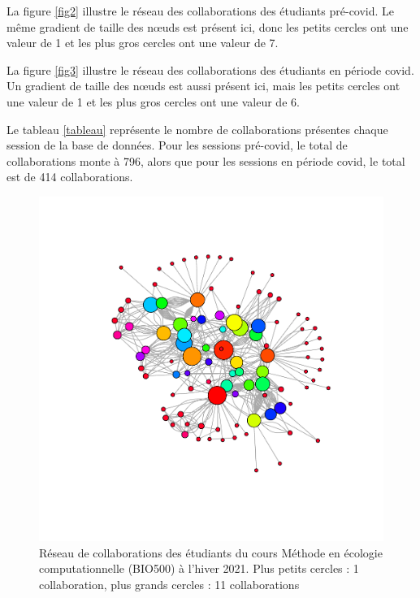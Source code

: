\documentclass[12pt]{article}
\begin{document}
\par La figure \ref{fig2} illustre le réseau des collaborations des étudiants pré-covid. Le même gradient de taille des nœuds est présent ici, donc les petits cercles ont une valeur de 1 et les plus gros cercles ont une valeur de 7. 

\par La figure \ref{fig3} illustre le réseau des collaborations des étudiants en période covid. Un gradient de taille des nœuds est aussi présent ici, mais les petits cercles ont une valeur de 1 et les plus gros cercles ont une valeur de 6.

\par Le tableau \ref{tableau} représente le nombre de collaborations présentes chaque session de la base de données. Pour les sessions pré-covid, le total de collaborations monte à 796, alors que pour les sessions en période covid, le total est de 414 collaborations.

\begin{figure}
    \centering
    \includegraphics[width=1\textwidth]{figures/fig1.pdf}
    \caption{Réseau de collaborations des étudiants du cours Méthode en écologie computationnelle (BIO500) à l’hiver 2021. Plus petits cercles : 1 collaboration, plus grands cercles : 11 collaborations}
    \label{fig1}
\end{figure}
\end{document}
